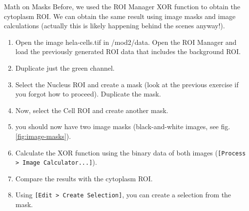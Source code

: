 \begin{taskbox}{Math on Masks}
Before, we used the ROI Manager XOR function to obtain the cytoplasm ROI. We can obtain the same result using image masks and image calculations (actually this is likely happening behind the scenes anyway!).

\begin{enumerate}
	\item Open the image hela-cells.tif in /mod2/data. Open the ROI Manager and load the previously generated ROI data that includes the background ROI.
	\item Duplicate just the green channel.
	\item Select the Nucleus ROI and create a mask (look at the previous exercise if you forgot how to proceed). Duplicate the mask.
	\item Now, select the Cell ROI and create another mask.
	\item you should now have two image masks (black-and-white images, see fig. \ref{fig:image-masks}).	
	
		\begin{minipage}[t]{\linewidth}
		\begin{center}
		\medskip
		\label{fig:image-masks}
		\end{center}
	\end{minipage}
	
	\item Calculate the XOR function using the binary data of both images (\texttt{[Process > Image Calculator...]}).
	\item Compare the results with the cytoplasm ROI.
	\item Using \texttt{[Edit > Create Selection]}, you can create a selection from the mask.
\end{enumerate}

\end{taskbox}

